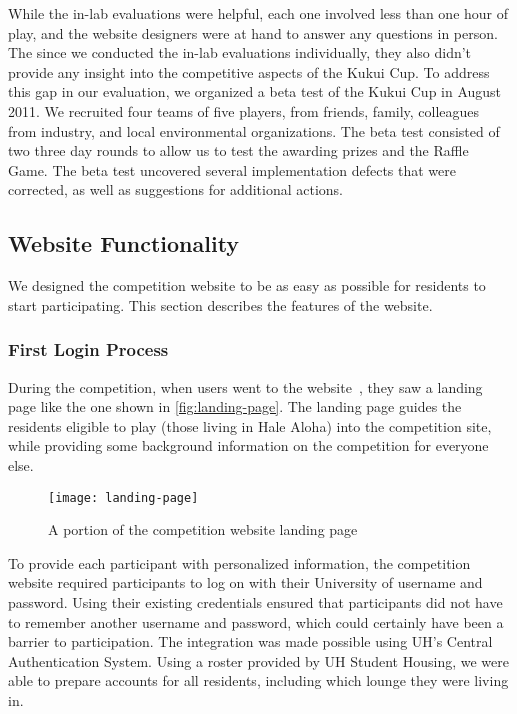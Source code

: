 While the in-lab evaluations were helpful, each one involved less than one hour of play, and the website designers were at hand to answer any questions in person. The since we conducted the in-lab evaluations individually, they also didn't provide any insight into the competitive aspects of the Kukui Cup. To address this gap in our evaluation, we organized a beta test of the Kukui Cup in August 2011. We recruited four teams of five players, from friends, family, colleagues from industry, and local environmental organizations. The beta test consisted of two three day rounds to allow us to test the awarding prizes and the Raffle Game. The beta test uncovered several implementation defects that were corrected, as well as suggestions for additional actions.


\subsection{Website Functionality}

We designed the competition website to be as easy as possible for residents to start participating. This section describes the features of the website.


\subsubsection{First Login Process}

During the competition, when users went to the website~\cite{kukuicup-website}, they saw a landing page like the one shown in \autoref{fig:landing-page}. The landing page guides the residents eligible to play (those living in Hale Aloha) into the competition site, while providing some background information on the competition for everyone else.

\begin{figure}[htbp]
	\centering
		\texttt{[image: landing-page]}
		\caption{A portion of the competition website landing page}
\label{fig:landing-page}
\end{figure}

To provide each participant with personalized information, the competition website required participants to log on with their University of \Hawaii username and password. Using their existing credentials ensured that participants did not have to remember another username and password, which could certainly have been a barrier to participation. The integration was made possible using UH's Central Authentication System. Using a roster provided by UH Student Housing, we were able to prepare accounts for all residents, including which lounge they were living in.

